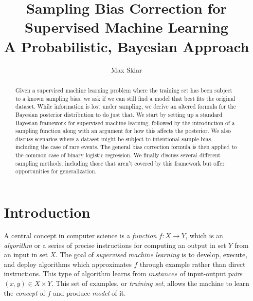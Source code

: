 \documentclass[twoside]{article}
\begin{document}
\parindent=0in
\parskip=12pt


\title{
  Sampling Bias Correction for Supervised Machine Learning \\
  \large{
    A  Probabilistic, Bayesian Approach
  }
}

\author{Max Sklar}

\maketitle
\thispagestyle{empty}

\begin{abstract}
Given a supervised machine learning problem where the training set has been subject to a known sampling bias, we ask if we can still find a model that best fits the original dataset. While information is lost under sampling, we derive an altered formula for the Bayesian posterior distribution to do just that. We start by setting up a standard Bayesian framework for supervised machine learning, followed by the introduction of a sampling function along with an argument for how this affects the posterior. We also discuss scenarios where a dataset might be subject to intentional sample bias, including the case of rare events. The general bias correction formula is then applied to the common case of binary logistic regression. We finally discuss several different sampling methods, including those that aren’t covered by this framework but offer opportunities for generalization.
\end{abstract}

\section{Introduction}
\label{section:introduction}

A central concept in computer science is a \textit{function} \(f: X \to Y\), which is an \textit{algorithm} or a series of precise instructions for computing an output in set \(Y\) from an input in set \(X\). The goal of \textit{supervised machine learning} is to develop, execute, and deploy algorithms which approximates \(f\) through example rather than direct instructions. This type of algorithm learns from \(instances\) of input-output pairs \((x, y) \in X \times Y\). This set of examples, or \textit{training set}, allows the machine to learn the \textit{concept} of \(f\) and produce \textit{model} of it.
\end{document}

